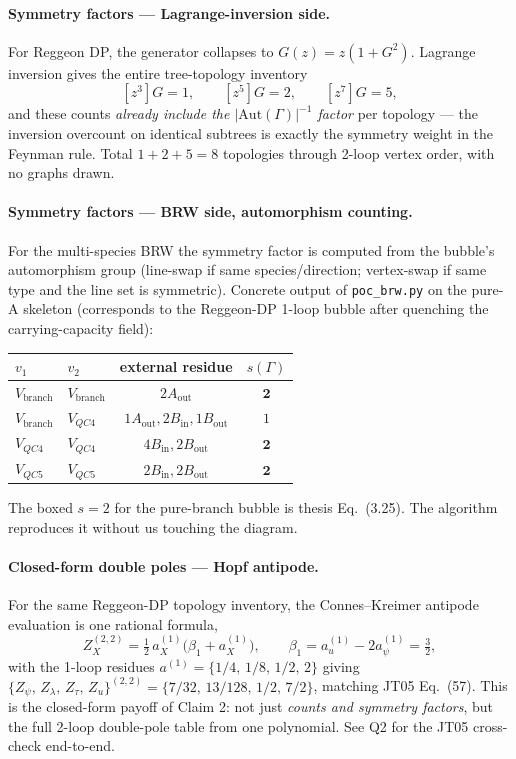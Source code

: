 \documentclass[11pt,a4paper]{article}
\begin{document}
\paragraph{Symmetry factors --- Lagrange-inversion side.}
For Reggeon DP, the generator collapses to $G(z) = z(1+G^2)$.  Lagrange
inversion gives the entire tree-topology inventory
\[
[z^3]G = 1,\qquad [z^5]G = 2,\qquad [z^7]G = 5,
\]
and these counts \emph{already include the $|\mathrm{Aut}(\Gamma)|^{-1}$
factor} per topology --- the inversion overcount on identical subtrees is
exactly the symmetry weight in the Feynman rule.  Total $1{+}2{+}5 = 8$
topologies through 2-loop vertex order, with no graphs drawn.

\paragraph{Symmetry factors --- BRW side, automorphism counting.}
For the multi-species BRW the symmetry factor is computed from the bubble's
automorphism group (line-swap if same species/direction; vertex-swap if same
type and the line set is symmetric).  Concrete output of \texttt{poc\_brw.py}
on the pure-A skeleton (corresponds to the Reggeon-DP 1-loop bubble after
quenching the carrying-capacity field):
\begin{center}
\begin{tabular}{llcc}
\toprule
$v_1$ & $v_2$ & external residue & $s(\Gamma)$ \\
\midrule
$V_{\text{branch}}$ & $V_{\text{branch}}$ & $2 A_{\text{out}}$ & $\mathbf{2}$ \\
$V_{\text{branch}}$ & $V_{QC4}$           & $1 A_{\text{out}}, 2 B_{\text{in}}, 1 B_{\text{out}}$ & $1$ \\
$V_{QC4}$           & $V_{QC4}$           & $4 B_{\text{in}}, 2 B_{\text{out}}$ & $\mathbf{2}$ \\
$V_{QC5}$           & $V_{QC5}$           & $2 B_{\text{in}}, 2 B_{\text{out}}$ & $\mathbf{2}$ \\
\bottomrule
\end{tabular}
\end{center}
The boxed $s = 2$ for the pure-branch bubble is thesis Eq.\ (3.25).  The
algorithm reproduces it without us touching the diagram.

\paragraph{Closed-form double poles --- Hopf antipode.}
For the same Reggeon-DP topology inventory, the Connes--Kreimer antipode
evaluation is one rational formula,
\[
Z_X^{(2,2)} = \tfrac12\,a_X^{(1)}\bigl(\beta_1 + a_X^{(1)}\bigr),
\qquad \beta_1 = a_u^{(1)} - 2a_\psi^{(1)} = \tfrac32,
\]
with the 1-loop residues $a^{(1)} = \{1/4,\,1/8,\,1/2,\,2\}$ giving
$\{Z_\psi,\,Z_\lambda,\,Z_\tau,\,Z_u\}^{(2,2)} = \{7/32,\,13/128,\,1/2,\,7/2\}$,
matching JT05 Eq.\ (57).  This is the closed-form payoff of Claim 2: not just
\emph{counts and symmetry factors}, but the full 2-loop double-pole table from
one polynomial.  See Q2 for the JT05 cross-check end-to-end.
\end{document}
